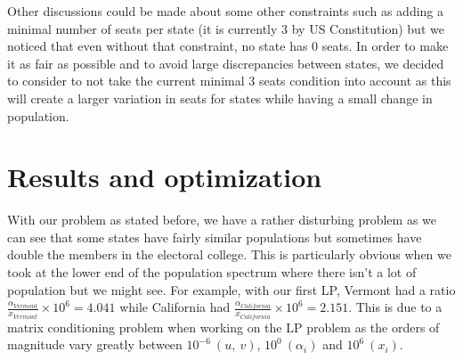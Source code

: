 \documentclass[a4paper,10pt,calibri,oneside,openany, twocolumn]{report}
\theoremstyle{break}
\begin{document}
Other discussions could be made about some other constraints such as adding a minimal number of seats per state (it is currently 3 by US Constitution) but we noticed that even without that constraint, no state has $0$ seats. In order to make it as fair as possible and to avoid large discrepancies between states, we decided to consider to not take the current minimal 3 seats condition into account as this will create a larger variation in seats for states while having a small change in population.
\section*{Results and optimization}
\qquad With our problem as stated before, we have a rather disturbing problem as we can see that some states have fairly similar populations but sometimes have double the members in the electoral college. This is particularly obvious when we took at the lower end of the population spectrum where there isn't a lot of population but we might see. For example, with our first LP, Vermont had a ratio $\frac{\alpha_{Vermont}}{x_{Vermont}}\times10^6=4.041$ while California had $\frac{\alpha_{California}}{x_{California}}\times10^6=2.151$. This is due to a matrix conditioning problem when working on the LP problem as the orders of magnitude vary greatly between $10^{-6}\ (u,\ v)$, $10^0\ (\alpha_i)$ and $10^6\ (x_i)$.\\
\end{document}
